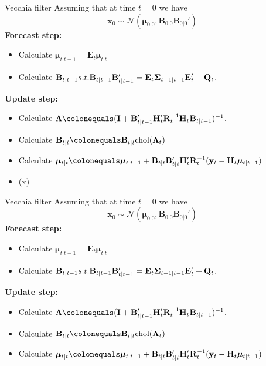 \documentclass{beamer}
\newcommand{\bx}{\mathbf{x}}
\newcommand{\by}{\mathbf{y}}
\newcommand{\bE}{\mathbf{E}}
\newcommand{\bI}{\mathbf{I}}
\newcommand{\bH}{\mathbf{H}}
\newcommand{\bQ}{\mathbf{Q}}
\newcommand{\bB}{\mathbf{B}}
\newcommand{\bR}{\mathbf{R}}
\newcommand{\bfmu}{\bm{\mu}}
\newcommand{\bfSigma}{\bm{\Sigma}}
\newcommand{\bfLambda}{\bm{\Lambda}}
\newcommand{\normal}{\mathcal{N}}
\begin{document}
\begin{frame}{Vecchia filter}
Assuming that at time $t=0$ we have 
$$\bx_0 \sim \normal(\bfmu_{0|0}, \bB_{0|0}\bB_{0|0}')$$
\textbf{Forecast step:}
\begin{itemize}
    \item Calculate $\bfmu_{t|t-1} = \bE_t \bfmu_{t|t}$
    \item Calculate $\bB_{t|t-1} s.t. \newline \bB_{t|t-1} \bB'_{t|t-1} = \bE_t \bfSigma_{t-1|t-1} \bE_t' + \bQ_t$.
\end{itemize}
\textbf{Update step:}
\begin{itemize}
    \item Calculate $\bfLambda \colonequals (\bI + \bB_{t|t-1}'\bH_t'\bR_t^{-1}\bH_t\bB_{t|t-1})^{-1}$.
    \item Calculate $\bB_{t|t} \colonequals \bB_{t|t}\text{chol}(\bfLambda_t)$
    \item Calculate $\bfmu_{t|t} \colonequals \bfmu_{t|t-1} +\bB_{t|t}\bB_{t|t}'\bH_t'\bR_t^{-1}(\by_t - \bH_t \bfmu_{t|t-1})$\color{red}
    \item (x)
\end{itemize}
\end{frame}



\begin{frame}{Vecchia filter}
Assuming that at time $t=0$ we have 
$$\bx_0 \sim \normal(\bfmu_{0|0}, \bB_{0|0}\bB_{0|0}')$$
\textbf{Forecast step:}
\begin{itemize}
    \item Calculate $\bfmu_{t|t-1} = \bE_t \bfmu_{t|t}$
    \item Calculate $\bB_{t|t-1} s.t. \newline \bB_{t|t-1} \bB'_{t|t-1} = \bE_t \bfSigma_{t-1|t-1} \bE_t' + \bQ_t$.
\end{itemize}
\textbf{Update step:}
\begin{itemize}
    \item Calculate $\bfLambda \colonequals (\bI + \bB_{t|t-1}'\bH_t'\bR_t^{-1}\bH_t\bB_{t|t-1})^{-1}$.
    \item Calculate $\bB_{t|t} \colonequals \bB_{t|t}\text{chol}(\bfLambda_t)$
    \item Calculate $\bfmu_{t|t} \colonequals \bfmu_{t|t-1} +\bB_{t|t}\bB_{t|t}'\bH_t'\bR_t^{-1}(\by_t - \bH_t \bfmu_{t|t-1})$\color{red}
\end{itemize}
\end{frame}
\end{document}
